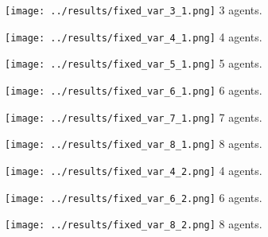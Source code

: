\documentclass[10pt]{article}
\begin{document}
\begin{multicols}{2}
\begin{figure*}
\begin{subfigure}[b]{\textwidth}
		\begin{minipage}{.33\linewidth}
			\centering\texttt{[image: ../results/fixed\_var\_3\_1.png]}
			3 agents.
		\end{minipage}
		\begin{minipage}{.33\linewidth}
			\centering\texttt{[image: ../results/fixed\_var\_4\_1.png]}
			4 agents.
		\end{minipage}
		\begin{minipage}{.33\linewidth}
			\centering\texttt{[image: ../results/fixed\_var\_5\_1.png]}
			5 agents.
		\end{minipage}
		\begin{minipage}{.33\linewidth}
			\centering\texttt{[image: ../results/fixed\_var\_6\_1.png]}
			6 agents.
		\end{minipage}
		\begin{minipage}{.33\linewidth}
			\centering\texttt{[image: ../results/fixed\_var\_7\_1.png]}
			7 agents.
		\end{minipage}
		\begin{minipage}{.33\linewidth}
			\centering\texttt{[image: ../results/fixed\_var\_8\_1.png]}
			8 agents.
		\end{minipage}
	\end{subfigure}
	
	\begin{subfigure}[b]{\textwidth}
		\begin{minipage}{.33\linewidth}
			\centering\texttt{[image: ../results/fixed\_var\_4\_2.png]}
			4 agents.
		\end{minipage}
		\begin{minipage}{.33\linewidth}
			\centering\texttt{[image: ../results/fixed\_var\_6\_2.png]}
			6 agents.
		\end{minipage}
		\begin{minipage}{.33\linewidth}
			\centering\texttt{[image: ../results/fixed\_var\_8\_2.png]}
			8 agents.
		\end{minipage}

	\end{subfigure}
	
	\setcounter{figure}{2}    
\end{figure*}
\fi

\end{multicols}
\newpage
\end{document}
